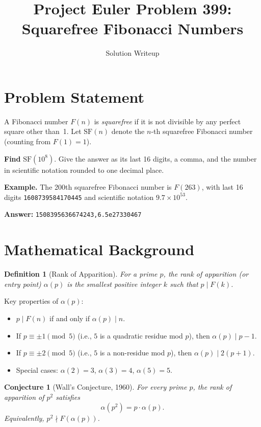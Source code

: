 \documentclass[11pt,a4paper]{article}
\title{Project Euler Problem 399:\\Squarefree Fibonacci Numbers}
\author{Solution Writeup}
\date{}
\newtheorem{definition}{Definition}
\newtheorem{conjecture}{Conjecture}
\begin{document}
\maketitle

\section{Problem Statement}

A Fibonacci number $F(n)$ is \emph{squarefree} if it is not divisible by any perfect square other than~1. Let $\mathrm{SF}(n)$ denote the $n$-th squarefree Fibonacci number (counting from $F(1) = 1$).

\textbf{Find} $\mathrm{SF}(10^8)$. Give the answer as its last 16 digits, a comma, and the number in scientific notation rounded to one decimal place.

\medskip
\noindent\textbf{Example.} The 200th squarefree Fibonacci number is $F(263)$, with last 16 digits \texttt{1608739584170445} and scientific notation $9.7 \times 10^{53}$.

\medskip
\noindent\textbf{Answer:} \texttt{1508395636674243,6.5e27330467}

\section{Mathematical Background}

\begin{definition}[Rank of Apparition]
For a prime $p$, the \emph{rank of apparition} (or entry point) $\alpha(p)$ is the smallest positive integer $k$ such that $p \mid F(k)$.
\end{definition}

Key properties of $\alpha(p)$:
\begin{itemize}
    \item $p \mid F(n)$ if and only if $\alpha(p) \mid n$.
    \item If $p \equiv \pm 1 \pmod{5}$ (i.e., $5$ is a quadratic residue mod $p$), then $\alpha(p) \mid p - 1$.
    \item If $p \equiv \pm 2 \pmod{5}$ (i.e., $5$ is a non-residue mod $p$), then $\alpha(p) \mid 2(p + 1)$.
    \item Special cases: $\alpha(2) = 3$, $\alpha(3) = 4$, $\alpha(5) = 5$.
\end{itemize}

\begin{conjecture}[Wall's Conjecture, 1960]
For every prime $p$, the rank of apparition of $p^2$ satisfies
\[
    \alpha(p^2) = p \cdot \alpha(p).
\]
Equivalently, $p^2 \nmid F(\alpha(p))$.
\end{conjecture}
\end{document}
